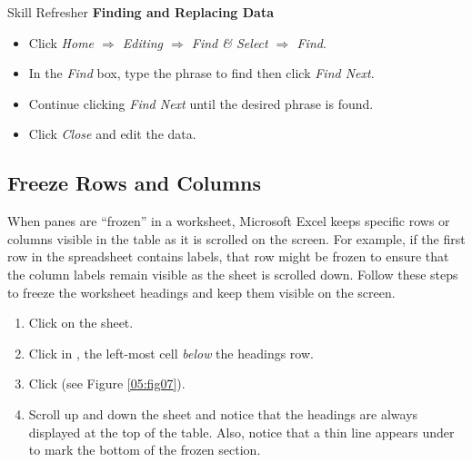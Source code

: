 \begin{center}
	\begin{sklbox}{Skill Refresher}
		\textbf{Finding and Replacing Data}
		\\
		\begin{itemize}
			\setlength{\itemsep}{0pt}
			\setlength{\parskip}{0pt}
			\setlength{\parsep}{0pt}

			\item Click \textit{Home $ \Rightarrow $ Editing $ \Rightarrow $ Find \& Select $ \Rightarrow $ Find}.
			\item In the \textit{Find} box, type the phrase to find then click \textit{Find Next}.
			\item Continue clicking \textit{Find Next} until the desired phrase is found.
			\item Click \textit{Close} and edit the data.
			
		\end{itemize}
	\end{sklbox}
\end{center}

\subsection{Freeze Rows and Columns}

When panes are ``frozen'' in a worksheet, Microsoft Excel keeps specific rows or columns visible in the table as it is scrolled on the screen. For example, if the first row in the spreadsheet contains labels, that row might be frozen to ensure that the column labels remain visible as the sheet is scrolled down. Follow these steps to freeze the worksheet headings and keep them visible on the screen.

\begin{enumbox}
	\begin{enumerate}
		\item Click on the  sheet.
		\item Click in , the left-most cell \textit{below} the headings row.
		\item Click  (see Figure \ref{05:fig07}).
		\item Scroll up and down the sheet and notice that the headings are always displayed at the top of the table. Also, notice that a thin line appears under  to mark the bottom of the frozen section.
	\end{enumerate}
\end{enumbox}
	
